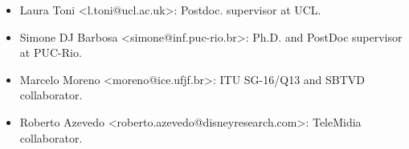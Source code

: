 
\begin{itemize}[nosep]
    \item Laura Toni <l.toni@ucl.ac.uk>: Postdoc. supervisor at UCL.
    
    
    \item Simone DJ Barbosa <simone@inf.puc-rio.br>: Ph.D. and PostDoc supervisor at PUC-Rio.
    
    \item Marcelo Moreno <moreno@ice.ufjf.br>: ITU SG-16/Q13 and SBTVD collaborator. 
    
    \item Roberto Azevedo <roberto.azevedo@disneyresearch.com>: TeleMidia collaborator. 
    
    
    
  \end{itemize}